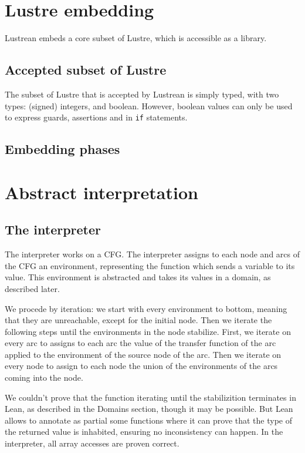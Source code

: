 \documentclass{scrartcl}
\begin{document}
\section{Lustre embedding}
Lustrean embeds a core subset of Lustre, which is accessible as a library.

\subsection{Accepted subset of Lustre}
The subset of Lustre that is accepted by Lustrean is simply typed, with two types: (signed)
integers, and boolean.  However, boolean values can only be used to express guards, assertions
and in \texttt{if} statements.

\subsection{Embedding phases}

\section{Abstract interpretation}
\subsection{The interpreter}

The interpreter works on a CFG. The interpreter assigns to each
node and arcs of the CFG an environment, representing
the function which sends a variable to its value. This
environment is abstracted and takes its values in a domain,
as described later.

We procede by iteration: we start with
every environment to bottom, meaning that they are unreachable,
except for the initial node. Then we iterate the following steps
until the environments in the node stabilize. First, we
iterate on every arc to assigns to each arc the value
of the transfer function of the arc applied to the environment
of the source node of the arc. Then we iterate on every node
to assign to each node the union of the environments of
the arcs coming into the node.

We couldn't prove that the function iterating until the stabilizition
terminates in Lean, as described in the Domains section,
though it may be possible. But Lean allows to annotate as partial
some functions where it can prove that the type of the returned
value is inhabited, ensuring no inconsistency can happen.
In the interpreter, all array accesses are proven correct.
\end{document}
